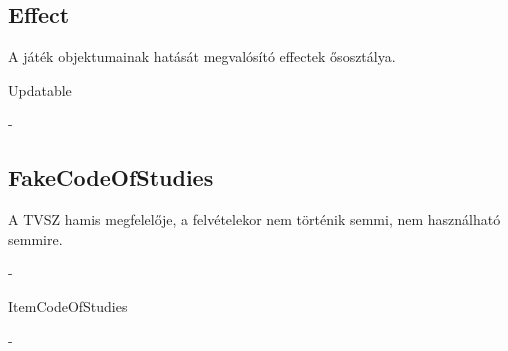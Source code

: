\subsection{Effect}
\begin{class-template-responsibility}
    A játék objektumainak hatását megvalósító effectek ősosztálya.
\end{class-template-responsibility}
\begin{class-template-interface}
    Updatable
\end{class-template-interface}
\begin{class-template-baseclass}
    - 
\end{class-template-baseclass}
\begin{class-template-attribute}
\end{class-template-attribute}
\begin{class-template-method}
\end{class-template-method}

\subsection{FakeCodeOfStudies}
\begin{class-template-responsibility}
    A TVSZ hamis megfelelője, a felvételekor nem történik semmi, nem használható semmire.
\end{class-template-responsibility}
\begin{class-template-interface}
    -
\end{class-template-interface}
\begin{class-template-baseclass}
    Item\baseclass CodeOfStudies
\end{class-template-baseclass}
\begin{class-template-attribute}
    -
\end{class-template-attribute}
\begin{class-template-method}
\end{class-template-method}


